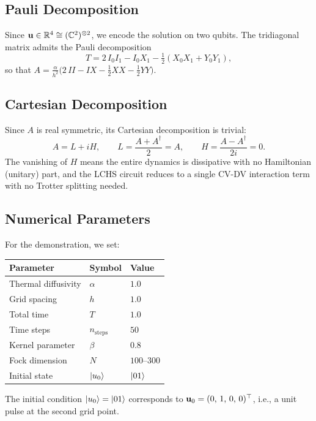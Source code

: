 \documentclass[11pt]{article}
\begin{document}
\subsection{Pauli Decomposition}

Since $\vb{u} \in \mathbb{R}^4 \cong (\mathbb{C}^2)^{\otimes 2}$, we encode
the solution on two qubits.  The tridiagonal matrix admits the Pauli decomposition
\begin{equation}\label{eq:pauli}
  T = 2\,I_0 I_1 - I_0 X_1 - \tfrac{1}{2}(X_0 X_1 + Y_0 Y_1),
\end{equation}
so that $A = \frac{\alpha}{h^2}\bigl(2\,II - IX - \frac{1}{2}XX - \frac{1}{2}YY\bigr)$.

\subsection{Cartesian Decomposition}

Since $A$ is real symmetric, its Cartesian decomposition is trivial:
\begin{equation}\label{eq:cartesian}
  A = L + iH, \qquad L = \frac{A+A^\dagger}{2} = A, \qquad
  H = \frac{A-A^\dagger}{2i} = 0.
\end{equation}
The vanishing of $H$ means the entire dynamics is dissipative with no
Hamiltonian (unitary) part, and the LCHS circuit reduces to a single
CV-DV interaction term with no Trotter splitting needed.

\subsection{Numerical Parameters}

For the demonstration, we set:
\begin{center}
\begin{tabular}{lll}
  \toprule
  Parameter & Symbol & Value \\
  \midrule
  Thermal diffusivity & $\alpha$ & $1.0$ \\
  Grid spacing & $h$ & $1.0$ \\
  Total time & $T$ & $1.0$ \\
  Time steps & $n_{\mathrm{steps}}$ & $50$ \\
  Kernel parameter & $\beta$ & $0.8$ \\
  Fock dimension & $N$ & $100$--$300$ \\
  Initial state & $\ket{u_0}$ & $\ket{01}$ \\
  \bottomrule
\end{tabular}
\end{center}
The initial condition $\ket{u_0}=\ket{01}$ corresponds to
$\vb{u}_0 = (0,\,1,\,0,\,0)^\top$, i.e., a unit pulse at the second grid point.
\end{document}
